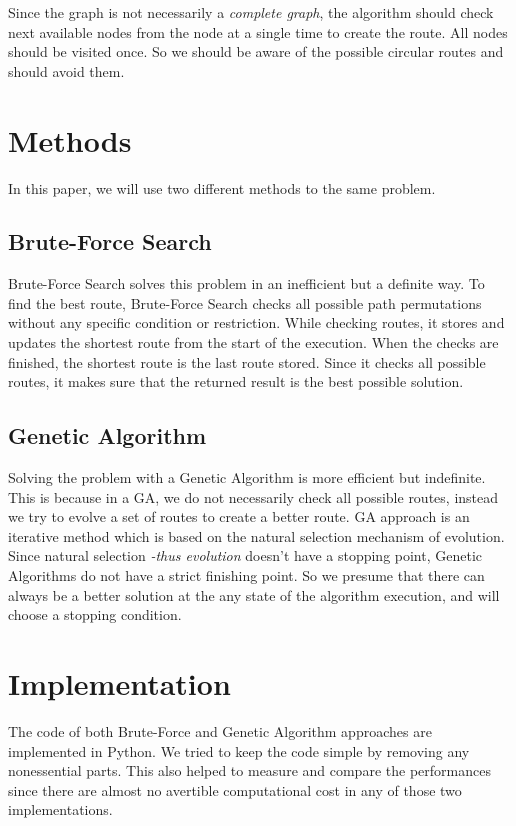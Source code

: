 \documentclass[journal,transmag]{IEEEtran}
\begin{document}
    Since the graph is not necessarily a \textit{complete graph}, the algorithm
    should check next available nodes from the node at a single time to create
    the route. All nodes should be visited once. So we should be aware of the
    possible circular routes and should avoid them.

    \section{Methods}
    In this paper, we will use two different methods to the same problem.

    \subsection{Brute-Force Search}
    Brute-Force Search solves this problem in an inefficient but a definite way.
    To find the best route, Brute-Force Search checks all possible path
    permutations without any specific condition or restriction. While checking
    routes, it stores and updates the shortest route from the start of the
    execution. When the checks are finished, the shortest route is the last
    route stored. Since it checks all possible routes, it makes sure that the
    returned result is the best possible solution.

    \subsection{Genetic Algorithm}
    Solving the problem with a Genetic Algorithm is more efficient but
    indefinite. This is because in a GA, we do not necessarily check all
    possible routes, instead we try to evolve a set of routes to create a better
    route. GA approach is an iterative method which is based on the natural
    selection mechanism of evolution. Since natural selection \textit{-thus
    evolution} doesn't have a stopping point, Genetic Algorithms do not have a
    strict finishing point. So we presume that there can always be a better
    solution at the any state of the algorithm execution, and will choose a
    stopping condition.


    \section{Implementation}
    The code \cite{code_repository} of both Brute-Force and Genetic Algorithm
    approaches are implemented in Python. We tried to keep the code simple by
    removing any nonessential parts. This also helped to measure and compare the
    performances since there are almost no avertible computational cost in any
    of those two implementations.
\end{document}
